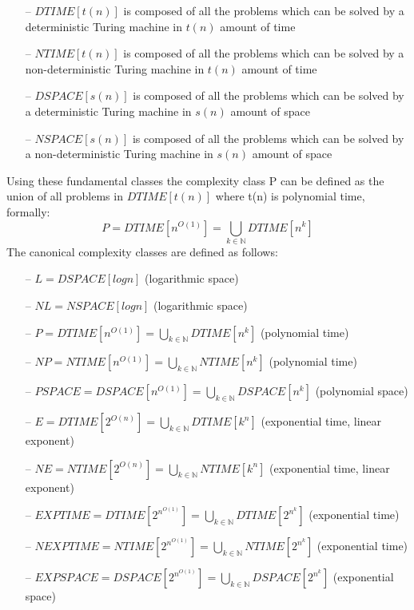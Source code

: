 \begin{itemize}
	\item[--] \textbf{$DTIME[t(n)]$} is composed of all the problems which can be solved by a deterministic Turing machine in $t(n)$ amount of time
	\item[--] \textbf{$NTIME[t(n)]$} is composed of all the problems which can be solved by a non-deterministic Turing machine in $t(n)$ amount of time
	\item[--] \textbf{$DSPACE[s(n)]$} is composed of all the problems which can be solved by a deterministic Turing machine in $s(n)$ amount of space
	\item[--] \textbf{$NSPACE[s(n)]$} is composed of all the problems which can be solved by a non-deterministic Turing machine in $s(n)$ amount of space
\end{itemize}

Using these fundamental classes the complexity class P can be defined as the union of all problems in $DTIME[t(n)]$ where t(n) is polynomial time, formally: 
\begin{equation*}
P=DTIME[n^{O(1)}]=\bigcup_{k\in\mathbb{N}}DTIME[n^k]
\end{equation*}
The canonical complexity classes are defined as follows:
\begin{itemize}
	\item[--] $L = DSPACE[log n]$ (logarithmic space)
	\item[--] $NL = NSPACE[log n]$ (logarithmic space)
	\item[--] $P = DTIME[n^{O(1)}] = \bigcup_{k\in\mathbb{N}}DTIME[n^k]$ (polynomial time)
	\item[--] $NP = NTIME[n^{O(1)}] = \bigcup_{k\in\mathbb{N}}NTIME[n^k]$ (polynomial time)
	\item[--] $PSPACE = DSPACE[n^{O(1)}] = \bigcup_{k\in\mathbb{N}}DSPACE[n^k]$ (polynomial space)
	\item[--] $E = DTIME[2^{O(n)}] = \bigcup_{k\in\mathbb{N}}DTIME[k^n]$ (exponential time, linear exponent)
	\item[--] $NE = NTIME[2^{O(n)}] = \bigcup_{k\in\mathbb{N}}NTIME[k^n]$ (exponential time, linear exponent)
	\item[--] $EXPTIME = DTIME[2^{n^{O(1)}}] = \bigcup_{k\in\mathbb{N}}DTIME[2^{n^k}]$ (exponential time)
	\item[--] $NEXPTIME = NTIME[2^{n^{O(1)}}] = \bigcup_{k\in\mathbb{N}}NTIME[2^{n^k}]$ (exponential time)
	\item[--] $EXPSPACE = DSPACE[2^{n^{O(1)}}] = \bigcup_{k\in\mathbb{N}}DSPACE[2^{n^k}]$ (exponential space)
\end{itemize}

